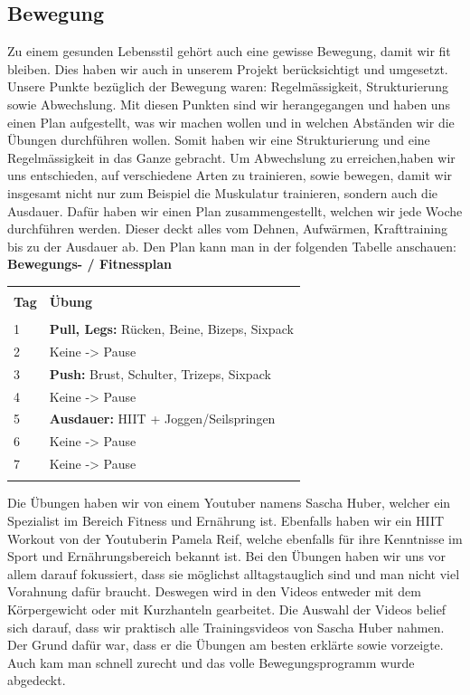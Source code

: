 \subsection{Bewegung}
\authortoc{\bastian}{\subsectionident}
Zu einem gesunden Lebensstil gehört auch eine gewisse Bewegung, damit wir fit bleiben. Dies haben wir auch in unserem Projekt berücksichtigt und umgesetzt. Unsere Punkte bezüglich der Bewegung waren: Regelmässigkeit, Strukturierung sowie Abwechslung. Mit diesen Punkten sind wir herangegangen und haben uns einen Plan aufgestellt, was wir machen wollen und in welchen Abständen wir die Übungen durchführen wollen. Somit haben wir eine Strukturierung und eine Regelmässigkeit in das Ganze gebracht. Um Abwechslung zu erreichen,haben wir uns entschieden, auf verschiedene Arten zu trainieren, sowie bewegen, damit wir insgesamt nicht nur zum Beispiel die Muskulatur trainieren, sondern auch die Ausdauer. Dafür haben wir einen Plan zusammengestellt, welchen wir jede Woche durchführen werden. Dieser deckt alles vom Dehnen, Aufwärmen, Krafttraining bis zu der Ausdauer ab. Den Plan kann man in der folgenden Tabelle anschauen:
\newline
\newline
\textbf{Bewegungs- / Fitnessplan}
\newline
\begin{table}[htp]
  \begin{tabularx}{\textwidth}{l X}\hline \\
    \textbf{Tag} & \textbf{Übung}  \\\hline \\
    1 & \textbf{Pull, Legs:} Rücken, Beine, Bizeps, Sixpack \\
    2 & Keine -> Pause \\
    3 & \textbf{Push:} Brust, Schulter, Trizeps, Sixpack \\
    4 & Keine -> Pause \\
    5 & \textbf{Ausdauer:} HIIT + Joggen/Seilspringen \\
    6 & Keine -> Pause \\
    7 & Keine -> Pause \\
    \\\hline
  \end{tabularx}
\end{table}
\newline
Die Übungen haben wir von einem Youtuber namens Sascha Huber, welcher ein Spezialist im Bereich Fitness und Ernährung ist. Ebenfalls haben wir ein HIIT Workout von der Youtuberin Pamela Reif, welche ebenfalls für ihre Kenntnisse im Sport und Ernährungsbereich bekannt ist. Bei den Übungen haben wir uns vor allem darauf fokussiert, dass sie möglichst alltagstauglich sind und man nicht viel Vorahnung dafür braucht. Deswegen wird in den Videos entweder mit dem Körpergewicht oder mit Kurzhanteln gearbeitet. Die Auswahl der Videos belief sich darauf, dass wir praktisch alle Trainingsvideos von Sascha Huber nahmen. Der Grund dafür war, dass er die Übungen am besten erklärte sowie vorzeigte. Auch kam man schnell zurecht und das volle Bewegungsprogramm wurde abgedeckt.

